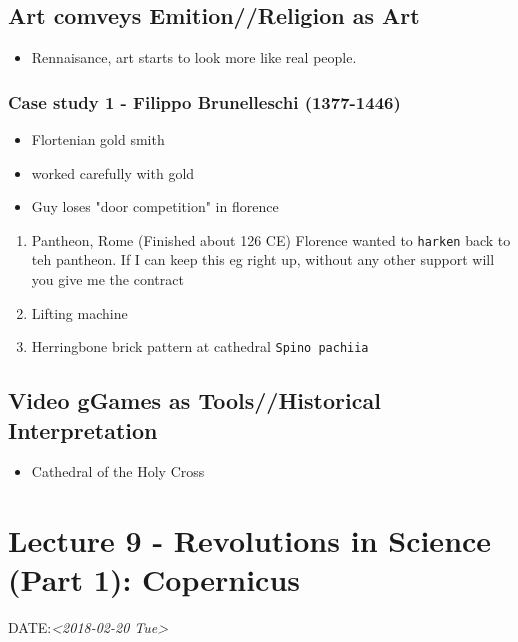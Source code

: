 \documentclass[11pt]{article}
\begin{document}
\subsection{Art comveys Emition//Religion as Art}
\label{sec-9-6}
\begin{itemize}
\item Rennaisance, art starts to look more like real people.
\end{itemize}

\subsubsection{Case study 1 - Filippo Brunelleschi (1377-1446)}
\label{sec-9-6-1}
\begin{itemize}
\item Flortenian gold smith
\item worked carefully with gold
\item Guy loses "door competition" in florence
\end{itemize}
\begin{enumerate}
\item Pantheon, Rome (Finished about 126 CE)
\label{sec-9-6-1-1}
Florence wanted to \texttt{harken} back to teh pantheon.
If I can keep this eg right up, without any other support will you give me the contract
\item Lifting machine
\label{sec-9-6-1-2}

\item Herringbone brick pattern at cathedral \texttt{Spino pachiia}
\label{sec-9-6-1-3}
\end{enumerate}

\subsection{Video gGames as Tools//Historical Interpretation}
\label{sec-9-7}
\begin{itemize}
\item Cathedral of the Holy Cross
\end{itemize}






















\section{Lecture 9 - Revolutions in Science (Part 1): Copernicus}
\label{sec-10}
DATE:\textit{<2018-02-20 Tue>}
\end{document}
